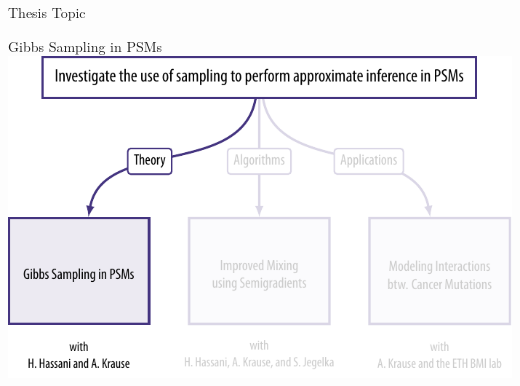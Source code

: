 \documentclass[mathserif]{beamer}
\begin{document}
\begin{frame}{Thesis Topic}
\vspace{1em}
\centering
{}%
\end{frame}

\begin{frame}{Gibbs Sampling in PSMs}
\vspace{1em}
\centering
\includegraphics[width=\textwidth]{figures/chapters1.pdf}
\end{frame}
\end{document}
